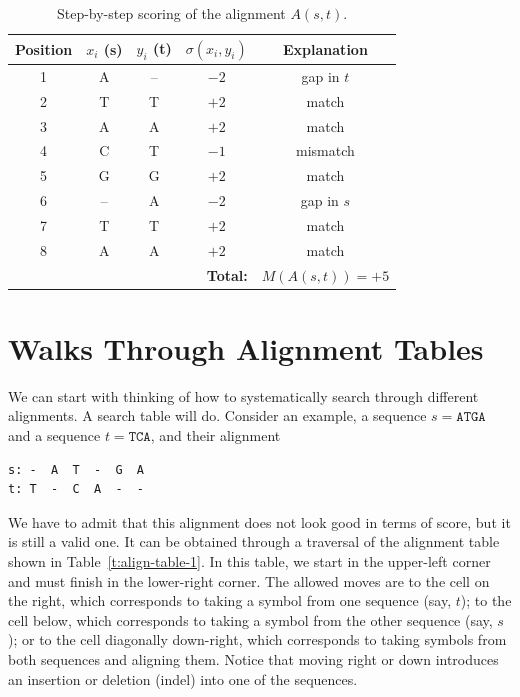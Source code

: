 \begin{table}[h!]
\centering
\caption{Step-by-step scoring of the alignment $A(s,t)$.}
\label{t:step_by_step_scoring}
\begin{tabular}{ccccc}
\hline
\textbf{Position} & \textbf{$x_i$ (s)} & \textbf{$y_i$ (t)} & \textbf{$\sigma(x_i, y_i)$} & \textbf{Explanation} \\
\hline
1 & A & -- & $-2$ & gap in $t$ \\
2 & T & T  & $+2$ & match \\
3 & A & A  & $+2$ & match \\
4 & C & T  & $-1$ & mismatch \\
5 & G & G  & $+2$ & match \\
6 & -- & A & $-2$ & gap in $s$ \\
7 & T & T  & $+2$ & match \\
8 & A & A  & $+2$ & match \\
\hline
\multicolumn{4}{r}{\textbf{Total:}} & $\displaystyle M(A(s,t)) = +5$ \\
\hline
\end{tabular}
\end{table}

\section{Walks Through Alignment Tables}

We can start with thinking of how to systematically search through different alignments. A search table will do. Consider an example, a sequence $s=\texttt{ATGA}$ and a sequence $t=\texttt{TCA}$, and their alignment 

\begin{verbatim}
s: -  A  T  -  G  A
t: T  -  C  A  -  -
\end{verbatim}

We have to admit that this alignment does not look good in terms of score, but it is still a valid one. It can be obtained through a traversal of the alignment table shown in Table~\ref{t:align-table-1}. In this table, we start in the upper-left corner and must finish in the lower-right corner. The allowed moves are to the cell on the right, which corresponds to taking a symbol from one sequence (say, $t$); to the cell below, which corresponds to taking a symbol from the other sequence (say, $s$); or to the cell diagonally down-right, which corresponds to taking symbols from both sequences and aligning them. Notice that moving right or down introduces an insertion or deletion (indel) into one of the sequences.

